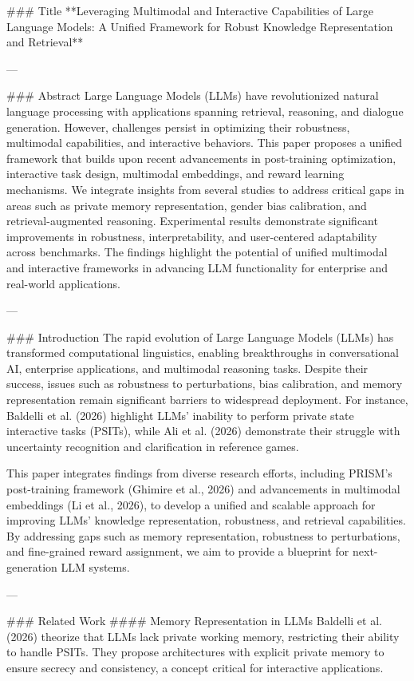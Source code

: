 ### Title  
**Leveraging Multimodal and Interactive Capabilities of Large Language Models: A Unified Framework for Robust Knowledge Representation and Retrieval**

---

### Abstract  
Large Language Models (LLMs) have revolutionized natural language processing with applications spanning retrieval, reasoning, and dialogue generation. However, challenges persist in optimizing their robustness, multimodal capabilities, and interactive behaviors. This paper proposes a unified framework that builds upon recent advancements in post-training optimization, interactive task design, multimodal embeddings, and reward learning mechanisms. We integrate insights from several studies to address critical gaps in areas such as private memory representation, gender bias calibration, and retrieval-augmented reasoning. Experimental results demonstrate significant improvements in robustness, interpretability, and user-centered adaptability across benchmarks. The findings highlight the potential of unified multimodal and interactive frameworks in advancing LLM functionality for enterprise and real-world applications.

---

### Introduction  
The rapid evolution of Large Language Models (LLMs) has transformed computational linguistics, enabling breakthroughs in conversational AI, enterprise applications, and multimodal reasoning tasks. Despite their success, issues such as robustness to perturbations, bias calibration, and memory representation remain significant barriers to widespread deployment. For instance, Baldelli et al. (2026) highlight LLMs' inability to perform private state interactive tasks (PSITs), while Ali et al. (2026) demonstrate their struggle with uncertainty recognition and clarification in reference games.

This paper integrates findings from diverse research efforts, including PRISM's post-training framework (Ghimire et al., 2026) and advancements in multimodal embeddings (Li et al., 2026), to develop a unified and scalable approach for improving LLMs' knowledge representation, robustness, and retrieval capabilities. By addressing gaps such as memory representation, robustness to perturbations, and fine-grained reward assignment, we aim to provide a blueprint for next-generation LLM systems.

---

### Related Work  
#### Memory Representation in LLMs  
Baldelli et al. (2026) theorize that LLMs lack private working memory, restricting their ability to handle PSITs. They propose architectures with explicit private memory to ensure secrecy and consistency, a concept critical for interactive applications.

